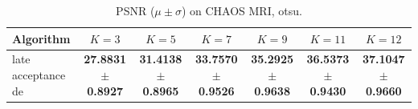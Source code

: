 \begin{table}[htbp]
\centering
\caption{PSNR ($\mu \pm \sigma$) on CHAOS MRI, otsu.}
\label{tab:exp2-otsu-psnr}
\begin{tabular}{lcccccc}
\toprule
Algorithm & $K=3$ & $K=5$ & $K=7$ & $K=9$ & $K=11$ & $K=12$ \\
\midrule
late acceptance de & \textbf{27.8831 $\pm$ 0.8927} & \textbf{31.4138 $\pm$ 0.8965} & \textbf{33.7570 $\pm$ 0.9526} & \textbf{35.2925 $\pm$ 0.9638} & \textbf{36.5373 $\pm$ 0.9430} & \textbf{37.1047 $\pm$ 0.9660} \\
\bottomrule
\end{tabular}
\end{table}
